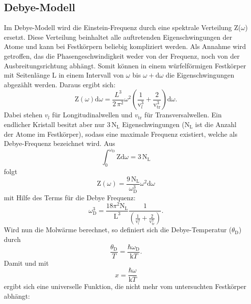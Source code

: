 \subsection{Debye-Modell}
\label{sec:Debye-Modell}
Im Debye-Modell wird die Einstein-Frequenz durch eine spektrale Verteilung Z($\omega$)
ersetzt. Diese Verteilung beinhaltet alle auftretenden Eigenschwingungen der Atome
und kann bei Festkörpern
beliebig kompliziert werden. Als Annahme wird getroffen, das die Phasengeschwindigkeit
weder von der Frequenz, noch von der Ausbreitungsrichtung abhängt. Somit können in
einem würfelförmigen Festkörper mit Seitenlänge L in einem Intervall von $\omega$ bis $\omega + \text{d}\omega$
die Eigenschwingungen abgezählt werden. Daraus ergibt sich:
\begin{equation}
  \text{Z}(\omega) \text{d}\omega = \frac{L^3}{2\,\pi^2}\omega^2\left(\frac{1}{\text{v}_l^3}+\frac{2}{\text{v}_\text{tr}^3}\right)\text{d}\omega.
\end{equation}
Dabei stehen $v_l$ für Longitudinalwellen und $v_\text{tr}$ für Transversalwellen. Ein endlicher Kristall besitzt aber nur $3\,\text{N}_\text{L}$ Eigenschwingungen ($\text{N}_\text{L}$
ist die Anzahl der Atome im Festkörper), sodass eine maximale Frequenz existiert, welche als Debye-Frequenz bezeichnet wird. Aus
\begin{equation}
  \int_0^{\omega_\text{D}} \text{Z} \text{d}\omega = 3\,\text{N}_\text{L}
\end{equation}
folgt
\begin{equation}
  \text{Z}(\omega) = \frac{9\,\text{N}_\text{L}}{\omega_\text{D}^3}\omega^2 \text{d}\omega
\end{equation}
mit Hilfe des Terms für die Debye Frequenz:
\begin{equation}
  \omega_\text{D}^3 = \frac{18\pi^2\text{N}_\text{L}}{\text{L}^3}\frac{1}{\left(\frac{1}{\text{v}_l^3}+\frac{2}{\text{v}_\text{tr}^3}\right)}.
  \label{eqn:debye-frequenz}
\end{equation}
Wird nun die Molwärme berechnet, so definiert sich die Debye-Temperatur ($\theta_\text{D}$) durch
\begin{equation}
  \frac{\theta_\text{D}}{T} = \frac{\hbar\omega_\text{D}}{\text{k}T}.
    \label{eqn:debye-temperatur}
\end{equation}
Damit und mit
\begin{equation}
  x = \frac{\hbar\omega}{\text{k}T}
\end{equation}
ergibt sich eine universelle Funktion, die nicht mehr vom untersuchten Festkörper abhängt:
